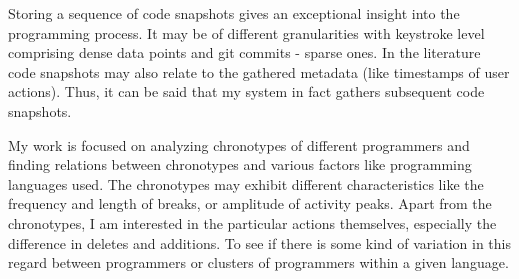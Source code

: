 Storing a sequence of code snapshots gives an exceptional insight into the programming process. It may be of different granularities with keystroke level comprising dense data points and git commits - sparse ones. In the literature code snapshots may also relate to the gathered metadata (like timestamps of user actions). Thus, it can be said that my system in fact gathers subsequent code snapshots.

My work is focused on analyzing chronotypes of different programmers and finding relations between chronotypes and various factors like programming languages used. The chronotypes may exhibit different characteristics like the frequency and length of breaks, or amplitude of activity peaks. Apart from the chronotypes, I am interested in the particular actions themselves, especially the difference in deletes and additions. To see if there is some kind of variation in this regard between programmers or clusters of programmers within a given language.
